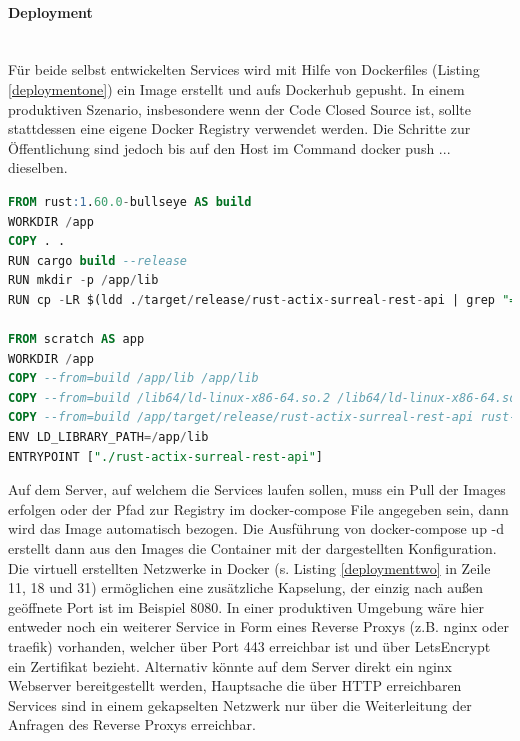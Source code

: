 \documentclass[notitlepage, hidelinks]{article}
\begin{document}
\paragraph{Deployment} \mbox{} \\
 Für beide selbst entwickelten Services wird mit Hilfe von Dockerfiles (Listing \ref{deploymentone}) ein Image erstellt und aufs Dockerhub gepusht. In einem produktiven Szenario, insbesondere wenn der Code Closed Source ist, sollte stattdessen eine eigene Docker Registry verwendet werden. Die Schritte zur Öffentlichung sind jedoch bis auf den Host im Command docker push ... dieselben. 

\begin{lstlisting}[language=SQL,frame=single,caption=Dockerfile für die Erstellung des REST-API Images ,label=deploymentone]
FROM rust:1.60.0-bullseye AS build
WORKDIR /app
COPY . .
RUN cargo build --release
RUN mkdir -p /app/lib
RUN cp -LR $(ldd ./target/release/rust-actix-surreal-rest-api | grep "=>" | cut -d ' ' -f 3) /app/lib

FROM scratch AS app
WORKDIR /app
COPY --from=build /app/lib /app/lib
COPY --from=build /lib64/ld-linux-x86-64.so.2 /lib64/ld-linux-x86-64.so.2
COPY --from=build /app/target/release/rust-actix-surreal-rest-api rust-actix-surreal-rest-api
ENV LD_LIBRARY_PATH=/app/lib
ENTRYPOINT ["./rust-actix-surreal-rest-api"]
\end{lstlisting}

Auf dem Server, auf welchem die Services laufen sollen, muss ein Pull der Images erfolgen oder der Pfad zur Registry im docker-compose File angegeben sein, dann wird das Image automatisch bezogen. Die Ausführung von docker-compose up -d erstellt dann aus den Images die Container mit der dargestellten Konfiguration. Die virtuell erstellten Netzwerke in Docker (s. Listing \ref{deploymenttwo} in Zeile 11, 18 und 31) ermöglichen eine zusätzliche Kapselung, der einzig nach außen geöffnete Port ist im Beispiel 8080. In einer produktiven Umgebung wäre hier entweder noch ein weiterer Service in Form eines Reverse Proxys (z.B. nginx oder traefik) vorhanden, welcher über Port 443 erreichbar ist und über LetsEncrypt ein Zertifikat bezieht. Alternativ könnte auf dem Server direkt ein nginx Webserver bereitgestellt werden, Hauptsache die über HTTP erreichbaren Services sind in einem gekapselten Netzwerk nur über die Weiterleitung der Anfragen des Reverse Proxys erreichbar. 
\end{document}
